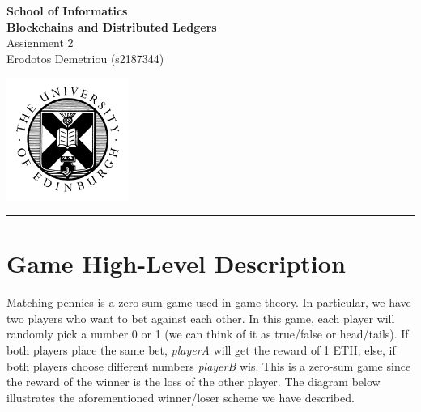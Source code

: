 \documentclass[12pt,a4paper]{article}
\begin{document}
\noindent
\begin{minipage}{120mm}
        {\huge {\bf School of Informatics}}\\
        {\Large {\bf Blockchains and Distributed Ledgers}}\\

        {\Large Assignment 2}\\
        {\normalsize Erodotos Demetriou (s2187344)}
\end{minipage}
\hfill
\begin{minipage}{40mm}              
        \includegraphics[width=40mm]{crest.png}
\end{minipage}

\begin{center}
\rule{\linewidth}{0.5mm}
\end{center}

\section*{Game High-Level Description}
Matching pennies is a zero-sum game used in game theory.
In particular, we have two players who want to bet against each other.
In this game, each player will randomly pick a number 0 or 1 
(we can think of it as true/false or head/tails). 
If both players place the same bet, \emph{playerA} will get the reward of 1 ETH; 
else, if both players choose different numbers \emph{playerB} wis. 
This is a zero-sum game since the reward of the winner is the loss of
the other player. The diagram below illustrates the aforementioned winner/loser
scheme we have described. \\
\end{document}
